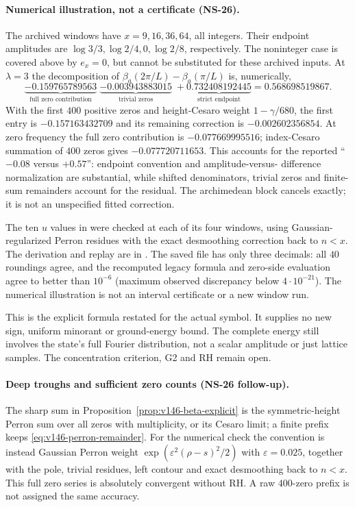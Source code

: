 \documentclass[11pt]{article}
\theoremstyle{remark}
\begin{document}
\paragraph{Numerical illustration, not a certificate (NS-26).}
The archived windows have $x=9,16,36,64$, all integers. Their endpoint
amplitudes are $\log3/3,\log2/4,0,\log2/8$, respectively. The
noninteger case is covered above by $e_x=0$, but cannot be substituted
for these archived inputs. At $\lambda=3$ the decomposition of
$\beta_a(2\pi/L)-\beta_a(\pi/L)$ is, numerically,
\[
 \underbrace{-0.159765789563}_{\text{full zero contribution}}
 \;\underbrace{-0.003943883015}_{\text{trivial zeros}}
 \;+\underbrace{0.732408192445}_{\text{strict endpoint}}
 =0.568698519867.
\]
With the first $400$ positive zeros and height-Cesaro weight
$1-\gamma/680$, the first entry is $-0.157163432709$ and its remaining
correction is $-0.002602356854$. At zero frequency the full zero
contribution is $-0.077669995516$; index-Cesaro summation of $400$
zeros gives $-0.077720711653$. This accounts for the reported
``$-0.08$ versus $+0.57$'': endpoint convention and amplitude-versus-
difference normalization are substantial, while shifted denominators,
trivial zeros and finite-sum remainders account for the residual.
The archimedean block cancels exactly; it is not an unspecified fitted
correction.

The ten $u$ values in 
were checked at each of its four windows, using Gaussian-regularized
Perron residues with the exact desmoothing correction back to $n<x$.
The derivation and replay are in
. The saved file has only
three decimals: all $40$ roundings agree, and the recomputed legacy
formula and zero-side evaluation agree to better than $10^{-6}$
(maximum observed discrepancy below $4\cdot10^{-21}$). The numerical
illustration is not an interval certificate or a new window run.

This is the explicit formula restated for the actual symbol. It
supplies no new sign, uniform minorant or ground-energy bound. The
complete energy still involves the state's full Fourier distribution,
not a scalar amplitude or just lattice samples. The concentration
criterion, G2 and RH remain open.

\paragraph{Deep troughs and sufficient zero counts (NS-26 follow-up).}
The sharp sum in Proposition~\ref{prop:v146-beta-explicit} is the
symmetric-height Perron sum over all zeros with multiplicity, or its
Cesaro limit; a finite prefix keeps \eqref{eq:v146-perron-remainder}.
For the numerical check the convention is instead Gaussian Perron
weight $\exp(\varepsilon^2(\rho-s)^2/2)$ with
$\varepsilon=0.025$, together with the pole, trivial residues, left
contour and exact desmoothing back to $n<x$. This full zero series
is absolutely convergent without RH. A raw $400$-zero prefix is not
assigned the same accuracy.
\end{document}
